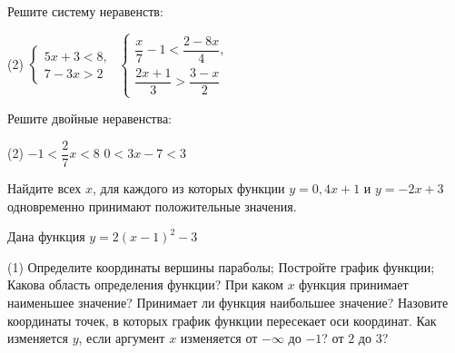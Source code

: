 \begin{homework}[number=3]
	\begin{listofex}
		\item Решите систему неравенств:
		\begin{tasks}(2)
			\task \( \left\{
			\begin{array}{l}
				5x+3<8,\\
				7-3x>2
			\end{array}
			\right. \)
			\task \( \left\{
			\begin{array}{l}
				\dfrac{x}{7}-1<\dfrac{2-8x}{4},\\[1em]
				\dfrac{2x+1}{3}>\dfrac{3-x}{2}
			\end{array}
			\right. \)
		\end{tasks}
		\item Решите двойные неравенства:
		\begin{tasks}(2)
			\task \( -1<\dfrac{2}{7}x<8 \)
			\task \( 0<3x-7<3 \)
		\end{tasks}
		\item Найдите всех \( x \), для каждого из которых функции \( y=0,4x+1 \) и \( y=-2x+3 \) одновременно принимают положительные значения.
		\item Дана функция \( y=2(x-1)^2-3 \)
		\begin{tasks}(1)
			\task Определите координаты вершины параболы;
			\task Постройте график функции;
			\task Какова область определения функции?
			\task При каком \( x \) функция принимает наименьшее значение? Принимает ли функция наибольшее значение?
			\task Назовите координаты точек, в которых график функции пересекает оси координат.
			\task Как изменяется \( y \), если аргумент \( x \) изменяется от \( -\infty  \) до \( -1 \)? от \( 2 \) до \( 3 \)?
		\end{tasks}
		\item 
	\end{listofex}
\end{homework}

